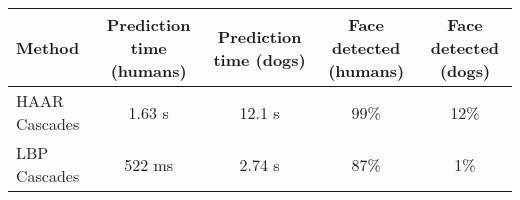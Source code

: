 \documentclass[11pt]{article}
\begin{document}
    \begin{longtable}[]{@{}lcccc@{}}
\toprule
\begin{minipage}[b]{0.07\columnwidth}\raggedright\strut
Method\strut
\end{minipage} & \begin{minipage}[b]{0.08\columnwidth}\centering\strut
Prediction time (humans)\strut
\end{minipage} & \begin{minipage}[b]{0.08\columnwidth}\centering\strut
Prediction time (dogs)\strut
\end{minipage} & \begin{minipage}[b]{0.08\columnwidth}\centering\strut
Face detected (humans)\strut
\end{minipage} & \begin{minipage}[b]{0.08\columnwidth}\centering\strut
Face detected (dogs)\strut
\end{minipage}\tabularnewline
\midrule
\endhead
\begin{minipage}[t]{0.07\columnwidth}\raggedright\strut
HAAR Cascades\strut
\end{minipage} & \begin{minipage}[t]{0.08\columnwidth}\centering\strut
1.63 s\strut
\end{minipage} & \begin{minipage}[t]{0.08\columnwidth}\centering\strut
12.1 s\strut
\end{minipage} & \begin{minipage}[t]{0.08\columnwidth}\centering\strut
99\%\strut
\end{minipage} & \begin{minipage}[t]{0.08\columnwidth}\centering\strut
12\%\strut
\end{minipage}\tabularnewline
\begin{minipage}[t]{0.07\columnwidth}\raggedright\strut
LBP Cascades\strut
\end{minipage} & \begin{minipage}[t]{0.08\columnwidth}\centering\strut
522 ms\strut
\end{minipage} & \begin{minipage}[t]{0.08\columnwidth}\centering\strut
2.74 s\strut
\end{minipage} & \begin{minipage}[t]{0.08\columnwidth}\centering\strut
87\%\strut
\end{minipage} & \begin{minipage}[t]{0.08\columnwidth}\centering\strut
1\%\strut

\end{minipage}
\end{longtable}
\end{document}
